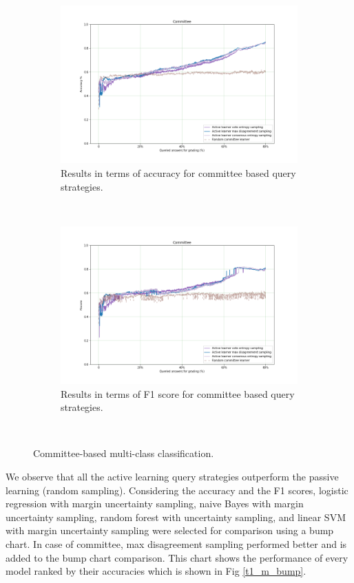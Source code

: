 	
	\begin{figure}[!htb]
		\begin{subfigure}[b]{0.5\textwidth}
			\includegraphics[width=\textwidth]{images/task1_accuracy_com}
			\caption{Results in terms of accuracy for committee based query strategies.}
			\label{t1_m_com}
		\end{subfigure}
		~
		\begin{subfigure}[b]{0.5\textwidth}
			\includegraphics[width=\textwidth]{images/task1_f1score_com}
			\caption{Results in terms of F1 score for committee based query strategies.}
			\label{t1_m_com_f1}
		\end{subfigure}
		~
		\caption{Committee-based multi-class classification.}
	\end{figure}
	
	We observe that all the active learning query strategies outperform the passive learning (random sampling). Considering the accuracy and the F1 scores, logistic regression with margin uncertainty sampling, naive Bayes with margin uncertainty sampling, random forest with uncertainty sampling, and linear SVM with margin uncertainty sampling were selected for comparison using a bump chart. In case of committee, max disagreement sampling performed better and is added to the bump chart comparison. This chart shows the performance of every model ranked by their accuracies which is shown in Fig \ref{t1_m_bump}.
	
